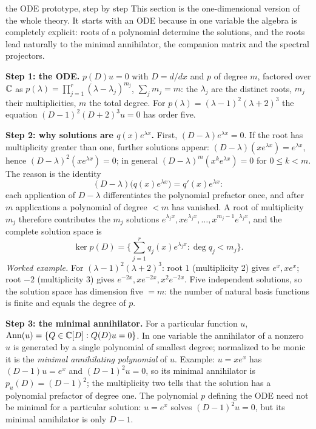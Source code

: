 \begin{explained}{the ODE prototype, step by step}
This section is the one-dimensional version of the whole theory. It starts with an ODE because in one variable the algebra is completely explicit: roots of a polynomial determine the solutions, and the roots lead naturally to the minimal annihilator, the companion matrix and the spectral projectors.

\medskip\textbf{Step 1: the ODE.} $p(D)u=0$ with $D=d/dx$ and $p$ of degree $m$, factored over $\mathbb{C}$ as $p(\lambda)=\prod_{j=1}^r(\lambda-\lambda_j)^{m_j}$, $\sum_jm_j=m$: the $\lambda_j$ are the distinct roots, $m_j$ their multiplicities, $m$ the total degree. For $p(\lambda)=(\lambda-1)^2(\lambda+2)^3$ the equation $(D-1)^2(D+2)^3u=0$ has order five.

\medskip\textbf{Step 2: why solutions are $q(x)e^{\lambda x}$.} First, $(D-\lambda)e^{\lambda x}=0$. If the root has multiplicity greater than one, further solutions appear: $(D-\lambda)(xe^{\lambda x})=e^{\lambda x}$, hence $(D-\lambda)^2(xe^{\lambda x})=0$; in general $(D-\lambda)^m(x^ke^{\lambda x})=0$ for $0\le k<m$. The reason is the identity
\[
(D-\lambda)\big(q(x)e^{\lambda x}\big)=q'(x)e^{\lambda x}:
\]
each application of $D-\lambda$ differentiates the polynomial prefactor once, and after $m$ applications a polynomial of degree $<m$ has vanished. A root of multiplicity $m_j$ therefore contributes the $m_j$ solutions $e^{\lambda_jx},xe^{\lambda_jx},\dots,x^{m_j-1}e^{\lambda_jx}$, and the complete solution space is
\[
\ker p(D)=\Big\{\sum_{j=1}^rq_j(x)e^{\lambda_jx}:\deg q_j<m_j\Big\}.
\]
\emph{Worked example.} For $(\lambda-1)^2(\lambda+2)^3$: root $1$ (multiplicity 2) gives $e^x,xe^x$; root $-2$ (multiplicity 3) gives $e^{-2x},xe^{-2x},x^2e^{-2x}$. Five independent solutions, so the solution space has dimension five $=m$: the number of natural basis functions is finite and equals the degree of $p$.

\medskip\textbf{Step 3: the minimal annihilator.} For a particular function $u$, $\operatorname{Ann}(u)=\{Q\in\mathbb{C}[D]:Q(D)u=0\}$. In one variable the annihilator of a nonzero $u$ is generated by a single polynomial of smallest degree; normalized to be monic it is the \emph{minimal annihilating polynomial} of $u$. Example: $u=xe^x$ has $(D-1)u=e^x$ and $(D-1)^2u=0$, so its minimal annihilator is $p_u(D)=(D-1)^2$; the multiplicity two tells that the solution has a polynomial prefactor of degree one. The polynomial $p$ defining the ODE need not be minimal for a particular solution: $u=e^x$ solves $(D-1)^2u=0$, but its minimal annihilator is only $D-1$.


\end{explained}
